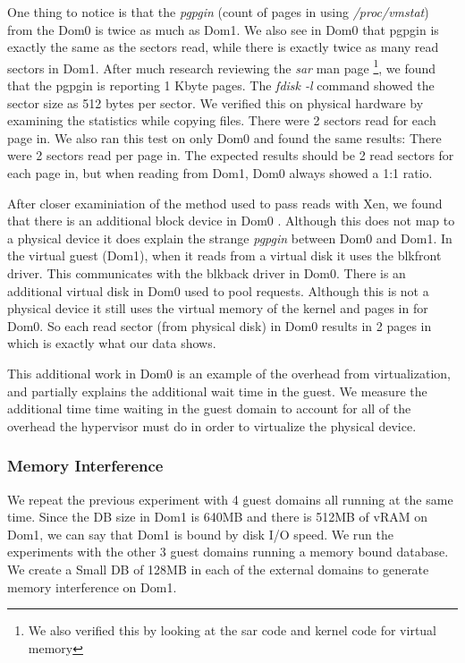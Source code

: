 One thing to notice is that the \emph{pgpgin} (count of pages in using \emph{/proc/vmstat}) from the Dom0 is twice as much as Dom1.  We also see in Dom0 that pgpgin is exactly the same as the sectors read, while there is exactly twice as many read sectors in Dom1.
After much research reviewing the \emph{sar} man page \footnote{We also verified this by looking at the sar code and kernel code for virtual memory}, we found that the pgpgin is reporting 1 Kbyte pages.  The \emph{fdisk -l} command showed the sector size as 512 bytes per sector.  We verified this on physical hardware by examining the statistics while copying files.  There were 2 sectors read for each page in.  We also ran this test on only Dom0 and found the same results:  There were 2 sectors read per page in.  The expected results should be 2 read sectors for each page in, but when reading from Dom1, Dom0 always showed a 1:1 ratio.

After closer examiniation of the method used to pass reads with Xen, we found that there is an additional block device in Dom0 \cite{citrix}.  Although this does not map to a physical device it does explain the strange \emph{pgpgin} between Dom0 and Dom1.  In the virtual guest (Dom1), when it reads from a virtual disk it uses the blkfront driver.  This communicates with the blkback driver in Dom0.  There is an additional virtual disk in Dom0 used to pool requests.  Although this is not a physical device it still uses the virtual memory of the kernel and pages in for Dom0.  So each read sector (from physical disk) in Dom0 results in 2 pages in which is exactly what our data shows.

This additional work in Dom0 is an example of the overhead from virtualization, and partially explains the additional wait time in the guest.  We measure the additional time time waiting in the guest domain to account for all of the overhead the hypervisor must do in order to virtualize the physical device.

\subsubsection{Memory Interference}
We repeat the previous experiment with 4 guest domains all running at the same time.  Since the DB size in Dom1 is 640MB and there is 512MB of vRAM on Dom1, we can say that Dom1 is bound by disk I/O speed.  We run the experiments with the other 3 guest domains running a memory bound database.  We create a Small DB of 128MB in each of the external domains to generate memory interference on Dom1.

